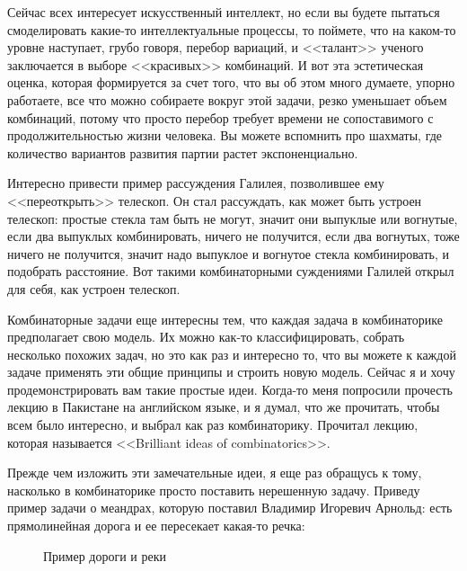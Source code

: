 \documentclass[russian]{lecture-notes}
\theoremstyle{definition}
\begin{document}
	Сейчас всех интересует искусственный интеллект, но если вы будете пытаться смоделировать какие-то интеллектуальные процессы, то поймете, что на каком-то уровне наступает, грубо говоря, перебор вариаций, и <<талант>> ученого заключается в выборе <<красивых>> комбинаций. И вот эта эстетическая оценка, которая формируется за счет того, что вы об этом много думаете, упорно работаете, все что можно собираете вокруг этой задачи, резко уменьшает объем комбинаций, потому что просто перебор требует времени не сопоставимого с продолжительностью жизни человека. Вы можете вспомнить про шахматы, где количество вариантов развития партии растет экспоненциально.
	
	Интересно привести пример рассуждения Галилея, позволившее ему <<переоткрыть>> телескоп. Он стал рассуждать, как может быть устроен телескоп: простые стекла там быть не могут, значит они выпуклые или вогнутые, если два выпуклых комбинировать, ничего не получится, если два вогнутых, тоже ничего не получится, значит надо выпуклое и вогнутое стекла комбинировать, и подобрать расстояние. Вот такими комбинаторными суждениями Галилей открыл для себя, как устроен телескоп.
	
	Комбинаторные задачи еще интересны тем, что каждая задача в комбинаторике предполагает свою модель. Их можно как-то классифицировать, собрать несколько похожих задач, но это как раз и интересно то, что вы можете к каждой задаче применять эти общие принципы и строить новую модель. Сейчас я и хочу продемонстрировать вам такие простые идеи. Когда-то меня попросили прочесть лекцию в Пакистане на английском языке, и я думал, что же прочитать, чтобы всем было интересно, и выбрал как раз комбинаторику. Прочитал лекцию, которая называется <<Brilliant ideas of combinatorics>>.
	
	
	Прежде чем изложить эти замечательные идеи, я еще раз обращусь к тому, насколько в комбинаторике просто поставить нерешенную задачу. Приведу пример задачи о меандрах, которую поставил Владимир Игоревич Арнольд: есть прямолинейная дорога и ее пересекает какая-то речка:
	\begin{figure}[H]
		\centering
		\caption{\small Пример дороги и реки}
	\end{figure}
\end{document}
